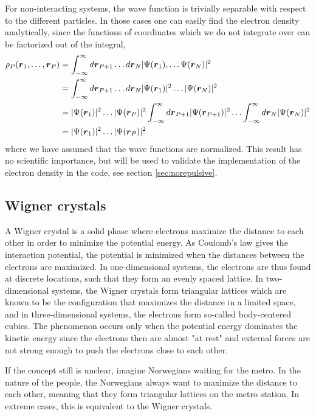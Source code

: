 For non-interacting systems, the wave function is trivially separable with respect to the different particles. In those cases one can easily find the electron density analytically, since the functions of coordinates which we do not integrate over can be factorized out of the integral,
\begin{equation}
\begin{aligned}
\rho_P(\boldsymbol{{r}}_1,\hdots,\boldsymbol{{r}}_P)&=\int_{-\infty}^{\infty}d\boldsymbol{{r}}_{P+1}\hdots d\boldsymbol{{r}}_N |\Psi(\boldsymbol{{r}}_1),\hdots \Psi(\boldsymbol{{r}}_N)|^2\\
&=\int_{-\infty}^{\infty}d\boldsymbol{{r}}_{P+1}\hdots d\boldsymbol{{r}}_N |\Psi(\boldsymbol{{r}}_1)|^2\hdots |\Psi(\boldsymbol{{r}}_N)|^2\\
&=|\Psi(\boldsymbol{{r}}_1)|^2\hdots |\Psi(\boldsymbol{{r}}_P)|^2\int_{-\infty}^{\infty}d\boldsymbol{{r}}_{P+1}|\Psi(\boldsymbol{{r}}_{P+1})|^2\hdots\int_{-\infty}^{\infty}d\boldsymbol{{r}}_{N}|\Psi(\boldsymbol{{r}}_{N})|^2\\
&=|\Psi(\boldsymbol{{r}}_1)|^2\hdots |\Psi(\boldsymbol{{r}}_P)|^2
\end{aligned}
\end{equation}
where we have assumed that the wave functions are normalized. This result has no scientific importance, but will be used to validate the implementation of the electron density in the code, see section \ref{sec:norepulsive}.

\subsection{Wigner crystals} \label{sec:wigner}
A Wigner crystal is a solid phase where electrons maximize the distance to each other in order to minimize the potential energy. As Coulomb's law gives the interaction potential, the potential is minimized when the distances between the electrons are maximized. In one-dimensional systems, the electrons are thus found at discrete locations, such that they form an evenly spaced lattice. In two-dimensional systems, the Wigner crystals form triangular lattices which are known to be the configuration that maximizes the distance in a limited space, and in three-dimensional systems, the electrons form so-called body-centered cubics. The phenomenon occurs only when the potential energy dominates the kinetic energy since the electrons then are almost "at rest" and external forces are not strong enough to push the electrons close to each other. 

If the concept still is unclear, imagine Norwegians waiting for the metro. In the nature of the people, the Norwegians always want to maximize the distance to each other, meaning that they form triangular lattices on the metro station. In extreme cases, this is equivalent to the Wigner crystals.



